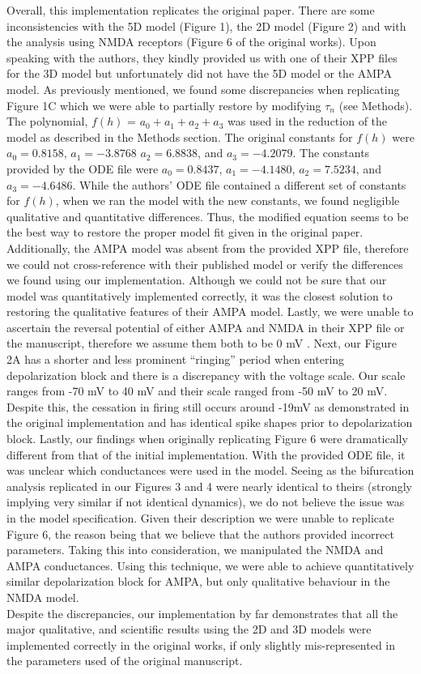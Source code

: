 Overall, this implementation replicates the original paper. There are some inconsistencies with the 5D model (Figure 1), the 2D model (Figure 2) and with the analysis using NMDA receptors (Figure 6 of the original works). Upon speaking with the authors, they kindly provided us with one of their XPP files for the 3D model but unfortunately did not have the 5D model or the AMPA model. As previously mentioned, we found some discrepancies when replicating Figure 1C which we were able to partially restore by modifying $\tau_n$ (see Methods). The polynomial, $f(h)$ = $a_0 + a_1 + a_2 + a_3$ was used in the reduction of the model as described in the Methods section.  The original constants for $f(h)$ were $a_0 =0.8158$, $a_1= −3.8768$ $a_2 = 6.8838$, and $a_3 = −4.2079$. The constants provided by the ODE file were $a_0 = 0.8437$, $a_1 = -4.1480$, $a_2 = 7.5234$, and $a_3 = -4.6486$. While the authors’ ODE file contained a different set of constants for $f(h)$, when we ran the model with the new constants, we found negligible qualitative and quantitative differences. Thus, the modified equation seems to be the best way to restore the proper model fit given in the original paper. Additionally, the AMPA model was absent from the provided XPP file, therefore we could not cross-reference with their published model or verify the differences we found using our implementation. Although we could not be sure that our model was quantitatively implemented correctly, it was the closest solution to restoring the qualitative features of their AMPA model. Lastly, we were unable to ascertain the reversal potential of either AMPA and NMDA in their XPP file or the manuscript, therefore we assume them both to be 0 mV \cite{neuroscience_2001}. Next, our Figure 2A has a shorter and less prominent ``ringing'' period when entering depolarization block and there is a discrepancy with the voltage scale. Our scale ranges from -70 mV to 40 mV and their scale ranged from -50 mV to 20 mV.  Despite this, the cessation in firing still occurs around -19mV as demonstrated in the original implementation and has identical spike shapes prior to depolarization block. Lastly, our findings when originally replicating Figure 6 were dramatically different from that of the initial implementation. With the provided ODE file, it was unclear which conductances were used in the model. Seeing as the bifurcation analysis replicated in our Figures 3 and 4 were nearly identical to theirs (strongly implying very similar if not identical dynamics), we do not believe the issue was in the model specification. Given their description we were unable to replicate Figure 6, the reason being that we believe that the authors provided incorrect parameters. Taking this into consideration, we manipulated the NMDA and AMPA conductances. Using this technique, we were able to achieve quantitatively similar depolarization block for AMPA, but only qualitative behaviour in the NMDA model.\\

Despite the discrepancies, our implementation by far demonstrates that all the major qualitative, and scientific results using the 2D and 3D models were implemented correctly in the original works, if only slightly mis-represented in the parameters used of the original manuscript.
